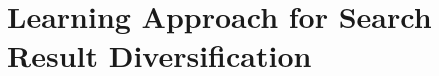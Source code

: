 \documentclass[review]{elsarticle}
\begin{document}



\section{Learning Approach for Search Result Diversification}\label{sec_model}
\end{document}

